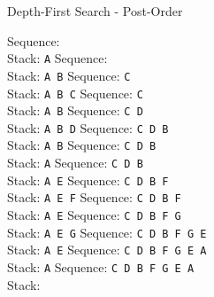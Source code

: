 \begin{frame}{Depth-First Search - Post-Order}
{\bigskip
\begin{overprint}
Sequence: \\
Stack: \alert{\texttt{A}}
Sequence: \\
Stack: \alert{\texttt{A  B}}
Sequence: \alert{\texttt{C}}\\
Stack: \alert{\texttt{A  B  C}}
Sequence: \alert{\texttt{C}}\\
Stack: \alert{\texttt{A  B}}
Sequence: \alert{\texttt{C  D}}\\
Stack: \alert{\texttt{A  B  D}}
Sequence: \alert{\texttt{C  D  B}}\\
Stack: \alert{\texttt{A  B}}
Sequence: \alert{\texttt{C  D  B}}\\
Stack: \alert{\texttt{A}}
Sequence: \alert{\texttt{C  D  B}}\\
Stack: \alert{\texttt{A  E}}
Sequence: \alert{\texttt{C  D  B  F}}\\
Stack: \alert{\texttt{A  E  F}}
Sequence: \alert{\texttt{C  D  B  F}}\\
Stack: \alert{\texttt{A  E}}
Sequence: \alert{\texttt{C  D  B  F  G}}\\
Stack: \alert{\texttt{A  E  G}}
Sequence: \alert{\texttt{C  D  B  F  G  E}}\\
Stack: \alert{\texttt{A  E}}
Sequence: \alert{\texttt{C  D  B  F  G  E  A}}\\
Stack: \alert{\texttt{A}}
Sequence: \alert{\texttt{C  D  B  F  G  E  A}}\\
Stack: 
\end{overprint}
}
\end{frame}




